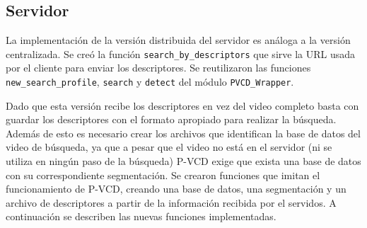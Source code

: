 \subsection{Servidor}

La implementación de la versión distribuida del servidor es análoga a la versión centralizada. Se creó la función \texttt{search\_by\_descriptors} que sirve la URL usada por el cliente para enviar los descriptores. Se reutilizaron las funciones \texttt{new\_search\_profile}, \texttt{search} y \texttt{detect} del módulo \texttt{PVCD\_Wrapper}. 

Dado que esta versión recibe los descriptores en vez del video completo basta con guardar los descriptores con el formato apropiado para realizar la búsqueda. Además de esto es necesario crear los archivos que identifican la base de datos del video de búsqueda, ya que a pesar que el video no está en el servidor (ni se utiliza en ningún paso de la búsqueda) P-VCD exige que exista una base de datos con su correspondiente segmentación. Se crearon funciones que imitan el funcionamiento de P-VCD, creando una base de datos, una segmentación y un archivo de descriptores a partir de la información recibida por el servidos. A continuación se describen las nuevas funciones implementadas.

